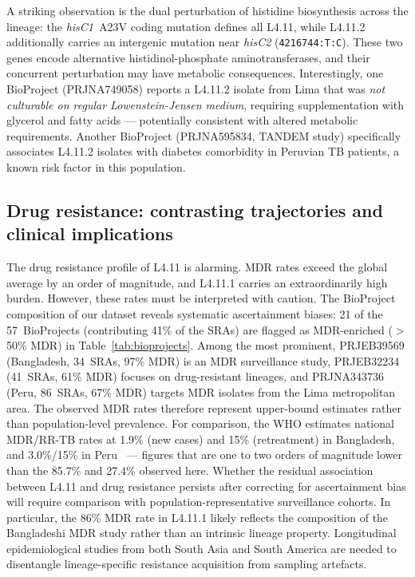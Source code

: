 \documentclass[11pt,a4paper]{article}
\newcommand{\spdi}[1]{\texttt{#1}}
\newcommand{\lignee}[1]{\textsf{#1}}
\begin{document}
A striking observation is the dual perturbation of histidine biosynthesis
across the lineage: the \textit{hisC1}~A23V coding mutation defines all
\lignee{L4.11}, while \lignee{L4.11.2} additionally carries an intergenic
mutation near \textit{hisC2} (\spdi{4216744:T:C}).  These two genes encode
alternative histidinol-phosphate aminotransferases, and their concurrent
perturbation may have metabolic consequences.  Interestingly, one BioProject
(PRJNA749058) reports a \lignee{L4.11.2} isolate from Lima that was
\textit{not culturable on regular Lowenstein-Jensen medium}, requiring
supplementation with glycerol and fatty acids --- potentially consistent with
altered metabolic requirements.  Another BioProject (PRJNA595834, TANDEM
study) specifically associates \lignee{L4.11.2} isolates with diabetes
comorbidity in Peruvian TB patients, a known risk factor in this population.

\subsection{Drug resistance: contrasting trajectories and clinical implications}

The drug resistance profile of \lignee{L4.11} is alarming.  MDR rates
exceed the global average by an order of magnitude, and
\lignee{L4.11.1} carries an extraordinarily high burden.  However,
these rates must be interpreted with caution.  The BioProject composition
of our dataset reveals systematic ascertainment biases:
21 of the 57~BioProjects (contributing 41\% of the SRAs) are flagged as
MDR-enriched ($>$50\% MDR) in Table~\ref{tab:bioprojects}.
Among the most prominent, PRJEB39569 (Bangladesh, 34~SRAs, 97\% MDR)
is an MDR surveillance study,
PRJEB32234 (41~SRAs, 61\% MDR) focuses on drug-resistant lineages,
and PRJNA343736 (Peru, 86~SRAs, 67\% MDR) targets MDR isolates
from the Lima metropolitan area.
The observed MDR rates therefore represent upper-bound estimates
rather than population-level prevalence.  For comparison, the WHO
estimates national MDR/RR-TB rates at 1.9\% (new cases) and 15\%
(retreatment) in Bangladesh, and 3.0\%/15\% in
Peru~\cite{who2024} --- figures that are one to two orders of magnitude
lower than the 85.7\% and 27.4\% observed here.
Whether the residual
association between \lignee{L4.11} and drug resistance persists after
correcting for ascertainment bias will require comparison with
population-representative surveillance cohorts.  In particular,
the 86\% MDR rate in \lignee{L4.11.1} likely reflects the composition
of the Bangladeshi MDR study rather than an intrinsic lineage property.
Longitudinal epidemiological studies from both South Asia and South
America are needed to disentangle lineage-specific resistance
acquisition from sampling artefacts.
\end{document}

